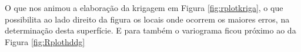   
\hspace*{1.25 cm} O que nos animou a elaboração da krigagem em Figura \ref{fig:rplotkriga}, o que possibilita ao lado direito da figura os locais onde ocorrem os maiores erros, na determinação desta superfície. E para também o variograma ficou próximo ao da Figura \ref{fig:Rplothddg}  \\
 

